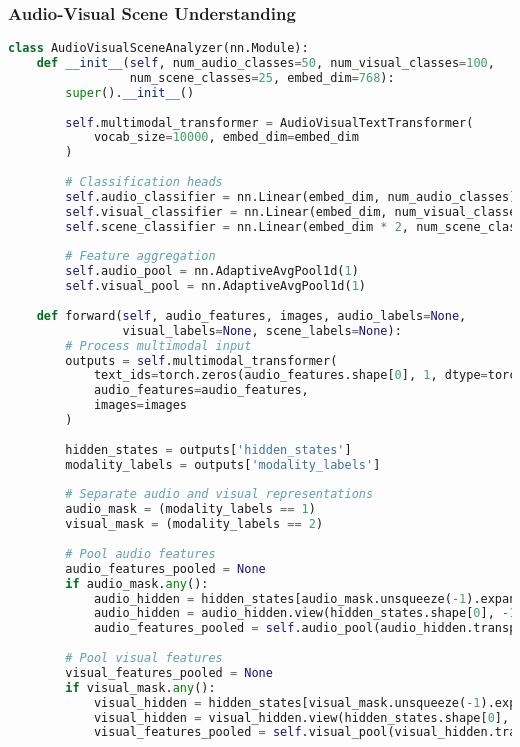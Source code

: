 \subsubsection{Audio-Visual Scene Understanding}

\begin{lstlisting}[language=Python, caption=Audio-visual scene analysis]
class AudioVisualSceneAnalyzer(nn.Module):
    def __init__(self, num_audio_classes=50, num_visual_classes=100, 
                 num_scene_classes=25, embed_dim=768):
        super().__init__()
        
        self.multimodal_transformer = AudioVisualTextTransformer(
            vocab_size=10000, embed_dim=embed_dim
        )
        
        # Classification heads
        self.audio_classifier = nn.Linear(embed_dim, num_audio_classes)
        self.visual_classifier = nn.Linear(embed_dim, num_visual_classes)
        self.scene_classifier = nn.Linear(embed_dim * 2, num_scene_classes)
        
        # Feature aggregation
        self.audio_pool = nn.AdaptiveAvgPool1d(1)
        self.visual_pool = nn.AdaptiveAvgPool1d(1)
        
    def forward(self, audio_features, images, audio_labels=None, 
                visual_labels=None, scene_labels=None):
        # Process multimodal input
        outputs = self.multimodal_transformer(
            text_ids=torch.zeros(audio_features.shape[0], 1, dtype=torch.long),
            audio_features=audio_features,
            images=images
        )
        
        hidden_states = outputs['hidden_states']
        modality_labels = outputs['modality_labels']
        
        # Separate audio and visual representations
        audio_mask = (modality_labels == 1)
        visual_mask = (modality_labels == 2)
        
        # Pool audio features
        audio_features_pooled = None
        if audio_mask.any():
            audio_hidden = hidden_states[audio_mask.unsqueeze(-1).expand_as(hidden_states)]
            audio_hidden = audio_hidden.view(hidden_states.shape[0], -1, hidden_states.shape[-1])
            audio_features_pooled = self.audio_pool(audio_hidden.transpose(1, 2)).squeeze(-1)
        
        # Pool visual features
        visual_features_pooled = None
        if visual_mask.any():
            visual_hidden = hidden_states[visual_mask.unsqueeze(-1).expand_as(hidden_states)]
            visual_hidden = visual_hidden.view(hidden_states.shape[0], -1, hidden_states.shape[-1])
            visual_features_pooled = self.visual_pool(visual_hidden.transpose(1, 2)).squeeze(-1)
        

\end{lstlisting}

